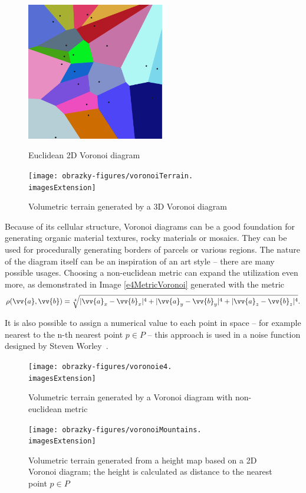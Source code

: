 \begin{figure}[H]
	\centering
	\begin{minipage}[t]{0.48\textwidth}
		\centering
		\includegraphics[height=6cm]{obrazky-figures/voronoiwiki.pdf}
		\caption{Euclidean 2D Voronoi diagram}
	\end{minipage}
	\hfill
	\begin{minipage}[t]{0.48\textwidth}
		\centering
		\texttt{[image: obrazky-figures/voronoiTerrain.\\imagesExtension]}
		\caption{Volumetric terrain generated by a 3D Voronoi diagram}
	\end{minipage}
\end{figure}

Because of its cellular structure, Voronoi diagrams can be a good foundation for generating organic material textures, rocky materials or mosaics. They can be used for procedurally generating borders of parcels or various regions. The nature of the diagram itself can be an inspiration of an art style -- there are many possible usages. Choosing a non-euclidean metric can expand the utilization even more, as demonstrated in Image \ref{e4MetricVoronoi} generated with the metric
\begin{equation}
	\rho(\vv{a}, \vv{b}) = \sqrt[4]{|\vv{a}_x - \vv{b}_x|^4 + |\vv{a}_y - \vv{b}_y|^4 + |\vv{a}_z - \vv{b}_z|^4} \text{.}
\end{equation}

It is also possible to assign a numerical value to each point in space -- for example nearest to the n-th nearest point $p \in P$ -- this approach is used in a noise function designed by Steven Worley~\cite{Worley1996}.

\begin{figure}[H]
	\centering
	\begin{minipage}[t]{0.48\textwidth}
		\centering
		\texttt{[image: obrazky-figures/voronoie4.\\imagesExtension]}
		\caption[]{Volumetric terrain generated by a Voronoi diagram with non-euclidean metric}
		\label{e4MetricVoronoi}
	\end{minipage}
	\hfill
	\begin{minipage}[t]{0.48\textwidth}
		\centering
		\texttt{[image: obrazky-figures/voronoiMountains.\\imagesExtension]}
		\caption{Volumetric terrain generated from a height map based on a 2D Voronoi diagram; the height is calculated as distance to the nearest point $p \in P$}
		\label{mountainsVoronoi}
	\end{minipage}
\end{figure}

